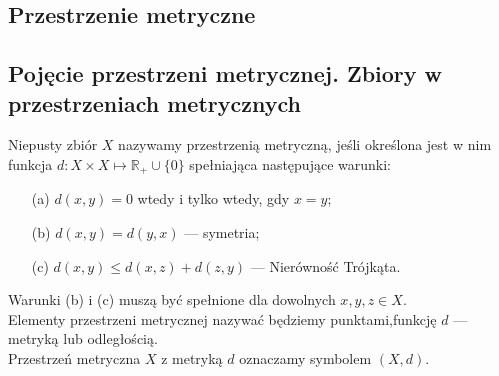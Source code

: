 \documentclass[leqno]{article}
\newcounter{defcounter}
\begin{document}
\begin{justify}
\newpage
\section{Przestrzenie metryczne}
\subsection{Pojęcie przestrzeni metrycznej. Zbiory w przestrzeniach metrycznych}

\setcounter{defcounter}{110}
\begin{defn}
Niepusty zbiór $X$ nazywamy przestrzenią metryczną, jeśli określona jest w nim funkcja $d : X \times X \mapsto \mathbb{R}_+ \cup \{0\}$ spełniająca
następujące warunki:
\begin{itemize}
    \item [(a)] $d(x, y) = 0$ wtedy i tylko wtedy, gdy $x = y$;
    \item [(b)] $d(x, y) = d(y, x)$ --- symetria;
    \item [(c)] $d(x, y) \leqslant d(x, z) + d(z, y)$ --- Nierówność Trójkąta.
\end{itemize}
Warunki (b) i (c) muszą być spełnione dla dowolnych $x, y, z \in X$. \\
Elementy przestrzeni metrycznej nazywać będziemy punktami,funkcję $d$ --- metryką lub odległością. \\
Przestrzeń metryczna $X$ z metryką $d$ oznaczamy symbolem $(X, d)$.
\end{defn}


\end{justify}
\end{document}
